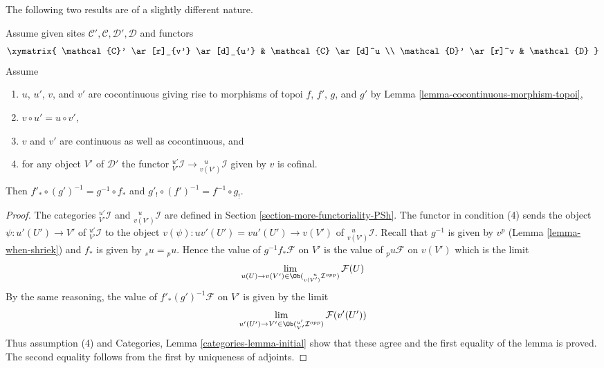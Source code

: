 \noindent
The following two results are of a slightly different nature.

\begin{lemma}
\label{lemma-special-square-cocontinuous}
Assume given sites $\mathcal{C}', \mathcal{C}, \mathcal{D}', \mathcal{D}$
and functors
$$
\xymatrix{
\mathcal{C}' \ar[r]_{v'} \ar[d]_{u'} &
\mathcal{C} \ar[d]^u \\
\mathcal{D}' \ar[r]^v &
\mathcal{D}
}
$$
Assume
\begin{enumerate}
\item $u$, $u'$, $v$, and $v'$ are cocontinuous giving rise to morphisms of
topoi $f$, $f'$, $g$, and $g'$ by Lemma \ref{lemma-cocontinuous-morphism-topoi},
\item $v \circ u' = u \circ v'$,
\item $v$ and $v'$ are continuous as well as cocontinuous, and
\item for any object $V'$ of $\mathcal{D}'$ the functor
${}^{u'}_{V'}\mathcal{I} \to {}^{\ \ \ u}_{v(V')}\mathcal{I}$
given by $v$ is cofinal.
\end{enumerate}
Then $f'_* \circ (g')^{-1} = g^{-1} \circ f_*$ and
$g'_! \circ (f')^{-1} = f^{-1} \circ g_!$.
\end{lemma}

\begin{proof}
The categories ${}^{u'}_{V'}\mathcal{I}$ and
${}^{\ \ \ u}_{v(V')}\mathcal{I}$ are defined in
Section \ref{section-more-functoriality-PSh}.
The functor in condition (4) sends the object
$\psi : u'(U') \to V'$ of ${}^{u'}_{V'}\mathcal{I}$ to the object
$v(\psi) : uv'(U') = vu'(U') \to v(V')$ of ${}^{\ \ \ u}_{v(V')}\mathcal{I}$.
Recall that $g^{-1}$ is given by $v^p$ (Lemma \ref{lemma-when-shriek}) and
$f_*$ is given by ${}_su = {}_pu$. Hence the value of
$g^{-1}f_*\mathcal{F}$ on $V'$ is the value of ${}_pu\mathcal{F}$
on $v(V')$ which is the limit
$$
\lim_{u(U) \to v(V') \in \Ob({}^{\ \ \ u}_{v(V')}\mathcal{I}^{opp})}
\mathcal{F}(U)
$$
By the same reasoning, the value of $f'_*(g')^{-1}\mathcal{F}$
on $V'$ is given by the limit
$$
\lim_{u'(U') \to V' \in \Ob({}^{u'}_{V'}\mathcal{I}^{opp})} \mathcal{F}(v'(U'))
$$
Thus assumption (4) and Categories, Lemma \ref{categories-lemma-initial}
show that these agree and the first equality of the
lemma is proved. The second equality follows from the first by uniqueness of
adjoints.
\end{proof}

